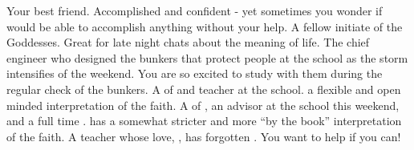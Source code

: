 \documentclass[char]{GL2020}
\begin{document}
\begin{contacts}
	\contact{\cPresident{}} Your best friend. Accomplished and confident - yet sometimes you wonder if \cPresident{\they} would be able to accomplish anything without your help.
	\contact{\cWarlordDaughter{}} A fellow initiate of the Goddesses. Great for late night chats about the meaning of life.
	\contact{\cBunker{}} The chief engineer who designed the bunkers that protect people at the school as the storm intensifies of the weekend. You are so excited to study with them during the regular check of the bunkers.
	\contact{\cFlowPriest{}} A \cFlowPriest{\cleric} of \cFlow{} and teacher at the school. \cFlowPriest{\They} \cFlowPriest{\have} a flexible and open minded interpretation of the faith.
	\contact{\cEbbPriest{}} A \cEbbPriest{\cleric} of \cEbb{}, an advisor at the school this weekend, and a full time \cEbbPriest{\cleric}. \cEbbPriest{} has a somewhat stricter and more ``by the book'' interpretation of the faith.
	\contact{\cChupAvenger{}} A teacher whose love, \cHeadScientist{}, has forgotten \cChupAvenger{\them}. You want to help if you can!
	
\end{contacts}
\end{document}
